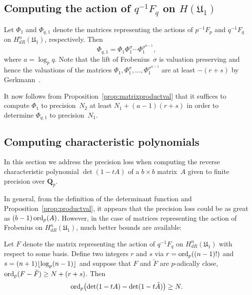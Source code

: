 \subsection{Computing the action of $q^{-1} F_q$ on $H(\mathfrak{U}_1)$}

Let $\Phi_1$ and $\Phi_{q,1}$ denote the matrices representing the 
actions of $p^{-1} F_p$ and $q^{-1} F_q$ on $H_{dR}^{n}(\mathfrak{U}_1)$, 
respectively.  Then 
\begin{equation*}
\Phi_{q,1} = \Phi_1 \Phi_1^{\sigma} \dotsm \Phi_1^{\sigma^{a-1}},
\end{equation*}
where $a = \log_p q$.  Note that the lift of Frobenius~$\sigma$ 
is valuation preserving and hence the valuations of the matrices 
$\Phi_1, \Phi_1^{\sigma}, \dotsc, \Phi_1^{\sigma^{a-1}}$ are at least 
$-(r+s)$ by Gerkmann~\citep[Lemma~3.3]{Gerkmann2007}.

It now follows from Proposition~\ref{prop:matrixproductval} that 
it suffices to compute $\Phi_1$ to precision~$N_2$ at least 
\mbox{$N_1 + (a-1) (r+s)$} in order to determine $\Phi_{q,1}$ to 
precision~$N_1$.

\subsection{Computing characteristic polynomials}

In this section we address the precision loss when computing the reverse 
characteristic polynomial $\det(1 - t A)$ of a $b \times b$ matrix~$A$ 
given to finite precision over $\mathbf{Q}_p$.

In general, from the definition of the determinant function and 
Proposition~\ref{prop:productval}, it appears that the precision 
loss could be as great as $(b-1) \operatorname{ord}_p(A)$.  However, in the case 
of matrices representing the action of Frobenius 
on $H_{dR}^n(\mathfrak{U}_1)$, much better bounds are available:

\begin{lem} \label{lem:charpoly}
Let $F$ denote the matrix representing the action of $q^{-1} F_q$ 
on $H_{dR}^{n}(\mathfrak{U}_1)$ with respect to some basis.  Define 
two integers $r$ and $s$ via \mbox{$r = \operatorname{ord}_p((n-1)!)$} and 
\mbox{$s = (n + 1) \lfloor\log_p (n-1)\rfloor$} and suppose that 
$F$ and $\tilde{F}$ are $p$-adically close, 
$\operatorname{ord}_p(F-\tilde{F}) \geq N + (r + s)$.  Then 
\begin{equation*}
\operatorname{ord}_p \bigl( \det(1 - t A) - \det(1 - t \tilde{A}) \bigr) \geq N.
\end{equation*}
\end{lem}

